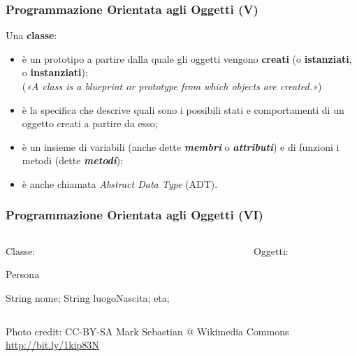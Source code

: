\begin{frame}[fragile]\frametitle{Programmazione Orientata agli Oggetti (V)}

  Una \textbf{classe}:
  \begin{itemize}
    \item è un prototipo a partire dalla quale gli oggetti vengono \textbf{creati} (o \textbf{istanziati}, 
	  o \textbf{instanziati});\\
          {\footnotesize (\emph{«A class is a blueprint or prototype from which objects are created.»}) }
          {\scriptsize {} }
    \item è la specifica che descrive quali sono i possibili stati e comportamenti di un oggetto creati
          a partire da esso;
    \item è un insieme di variabili (anche dette \textbf{\emph{membri}} o \textbf{\emph{attributi}}) e di
         funzioni i metodi (dette \textbf{\emph{metodi}});
    \item è anche chiamata \emph{Abstract Data Type} (ADT).
  \end{itemize}
\end{frame}



\begin{frame}[fragile]\frametitle{Programmazione Orientata agli Oggetti (VI)}


  \begin{columns}[T]
    \begin{column}[T]{7cm}
    Classe:
    \begin{JavaCodePlain}[commandchars=\\!|]
    
    \Jpublic \Jclass Persona {

      \Jprivate String nome;      
      \Jprivate String luogoNascita;
      \Jprivate \Jint eta;

    }

    \end{JavaCodePlain}
    \end{column}

    \begin{column}[T]{5cm}
    Oggetti:
    \begin{center}
    \end{center}
    \end{column}
  \end{columns}


  \begin{minipage}[b]{12cm}
  {\scriptsize Photo credit: CC-BY-SA Mark Sebastian @ Wikimedia Commons \url{http://bit.ly/1kip83N}}
  \end{minipage}
\end{frame}

